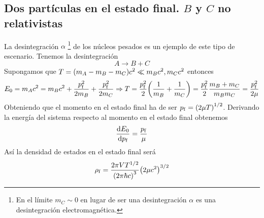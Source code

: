 \subsection{Dos partículas en el estado final. $B$ y $C$ no relativistas}
\noindent La desintegración $\alpha$ \footnote{En el límite $m_C\sim 0$ en lugar de ser una desintegración $\alpha$ es una desintegración electromagnética.} de los núcleos pesados es un ejemplo de este tipo de escenario. Tenemos la desintegración $$A\longrightarrow B+C$$ Supongamos que $T=\qty(m_A-m_B-m_C)c^2\ll m_Bc^2,m_Cc^2$ entonces
\begin{equation*}
E_0=m_Ac^2=m_Bc^2+\frac{p_\mathrm{f}^2}{2m_B}+\frac{p_\mathrm{f}^2}{2m_C} \Rightarrow T=\frac{p_\mathrm{f}^2}{2}\qty(\frac{1}{m_B}+\frac{1}{m_C})=\frac{p_\mathrm{f}^2}{2}\frac{m_B+m_C}{m_Bm_C}=\frac{p_\mathrm{f}^2}{2\mu}
\end{equation*}
Obteniendo que el momento en el estado final ha de ser $    p_\mathrm{f}=\qty(2\mu T)^{1/2}$. Derivando la energía del sistema respecto al momento en el estado final obtenemos
\begin{equation}
    \dv{E_0}{p_\mathrm{f}}=\frac{p_\mathrm{f}}{\mu}
\end{equation}
Así la densidad de estados en el estado final será
\begin{equation}
    \rho_\mathrm{f}= \frac{2\pi V T^{1/2}}{\qty(2\pi\hbar c)^3}\qty(2\mu c^2)^{3/2}
    \label{eq: densidad de estados final desintegracion no relativista}
\end{equation}

